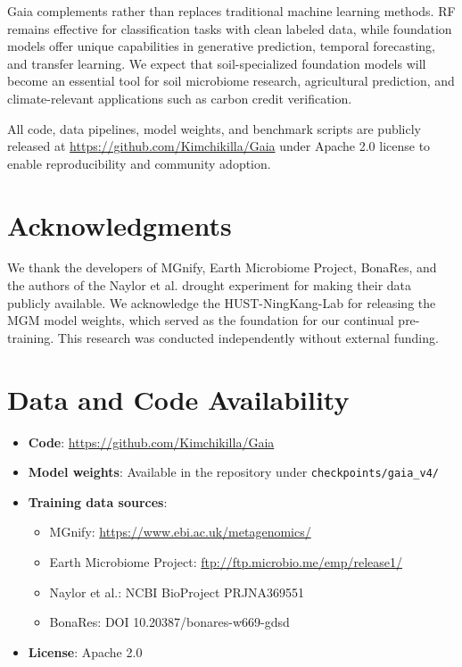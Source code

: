 \documentclass[11pt,a4paper]{article}
\begin{document}
Gaia complements rather than replaces traditional machine learning methods. RF remains effective for classification tasks with clean labeled data, while foundation models offer unique capabilities in generative prediction, temporal forecasting, and transfer learning. We expect that soil-specialized foundation models will become an essential tool for soil microbiome research, agricultural prediction, and climate-relevant applications such as carbon credit verification.

All code, data pipelines, model weights, and benchmark scripts are publicly released at \url{https://github.com/Kimchikilla/Gaia} under Apache 2.0 license to enable reproducibility and community adoption.

\section*{Acknowledgments}

We thank the developers of MGnify, Earth Microbiome Project, BonaRes, and the authors of the Naylor et al. drought experiment for making their data publicly available. We acknowledge the HUST-NingKang-Lab for releasing the MGM model weights, which served as the foundation for our continual pre-training. This research was conducted independently without external funding.

\section*{Data and Code Availability}

\begin{itemize}[leftmargin=1.5em]
    \item \textbf{Code}: \url{https://github.com/Kimchikilla/Gaia}
    \item \textbf{Model weights}: Available in the repository under \texttt{checkpoints/gaia\_v4/}
    \item \textbf{Training data sources}:
    \begin{itemize}
        \item MGnify: \url{https://www.ebi.ac.uk/metagenomics/}
        \item Earth Microbiome Project: \url{ftp://ftp.microbio.me/emp/release1/}
        \item Naylor et al.: NCBI BioProject PRJNA369551
        \item BonaRes: DOI 10.20387/bonares-w669-gdsd
    \end{itemize}
    \item \textbf{License}: Apache 2.0
\end{itemize}
\end{document}
